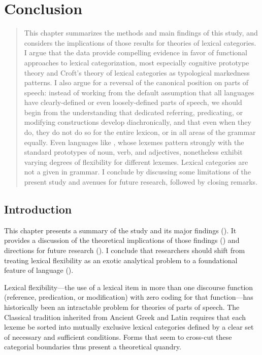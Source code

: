\chapter{Conclusion}
\label{ch:conclusion}

\blockquote{This chapter summarizes the methods and main findings of this study, and considers the implications of those results for theories of lexical categories. I argue that the data provide compelling evidence in favor of functional approaches to lexical categorization, most especially cognitive prototype theory and Croft's theory of lexical categories as typological markedness patterns. I also argue for a reversal of the canonical position on parts of speech: instead of working from the default assumption that all languages have clearly-defined or even loosely-defined parts of speech, we should begin from the understanding that dedicated referring, predicating, or modifying constructions develop diachronically, and that even when they do, they do not do so for the entire lexicon, or in all areas of the grammar equally. Even languages like , whose lexemes pattern strongly with the standard prototypes of noun, verb, and adjectives, nonetheless exhibit varying degrees of flexibility for different lexemes. Lexical categories are not a given in grammar. I conclude by discussing some limitations of the present study and avenues for future research, followed by closing remarks.}

\section{Introduction}
\label{sec:5.1}

This chapter presents a summary of the study and its major findings (). It provides a discussion of the theoretical implications of those findings () and directions for future research (). I conclude that researchers should shift from treating lexical flexibility as an exotic analytical problem to a foundational feature of language ().

Lexical flexibility—the use of a lexical item in more than one discourse function (reference, predication, or modification) with zero coding for that function—has historically been an intractable problem for theories of parts of speech. The Classical tradition inherited from Ancient Greek and Latin requires that each lexeme be sorted into mutually exclusive lexical categories defined by a clear set of necessary and sufficient conditions. Forms that seem to cross-cut these categorial boundaries thus present a theoretical quandry.


